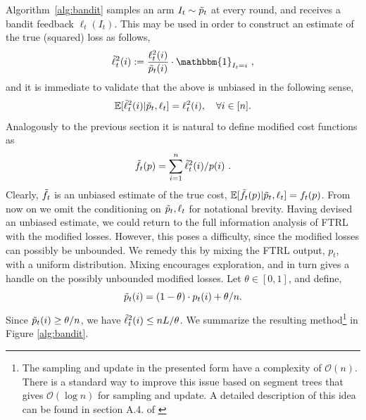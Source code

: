 Algorithm~\ref{alg:bandit} samples an arm $I_t\sim \tilde{p}_t$ at every round, and receives a bandit feedback $\ell_t(I_t)$. 
This may be used in order to construct an estimate of the true (squared) loss as follows,
%
%
\begin{equation*}
\tell_t^2(i) := \frac{\ell_t^2(i)}{\tp_t(i)}\cdot \mathbbm{1} _{I_t=i}~,
\end{equation*}
and it is immediate to validate that the above is unbiased in the following sense, 
\begin{equation*}
\mathbb{E}[\tilde{\ell}_t^2(i) \vert \tilde{p}_t,\ell_t] = \ell_t^2(i),\quad \forall i\in[n].
\end{equation*}
Analogously to the previous section it is natural to define modified cost functions as 
\begin{equation*}
\tilde{f}_t(p) = \sum_{i=1}^n {\tilde{\ell}_t^2(i)}/{p(i)}~.
\end{equation*}
Clearly, $\tilde{f}_t$ is an unbiased estimate of the true cost, $\mathbb{E}[\tilde{f}_t(p) \vert \tilde{p}_t,\ell_t] = f_t(p)$.
From now on  we omit the conditioning on $\tilde{p}_t,\ell_t$ for notational brevity. 
Having devised an unbiased estimate, we could return to the full information analysis of FTRL with the modified losses. However, this poses a difficulty, since the modified losses  can possibly be unbounded. We remedy this by mixing the FTRL output, $p_t$, with a uniform distribution.
Mixing encourages exploration, and in turn gives a handle on the possibly unbounded modified losses. Let $\theta\in [0,1]$, and define,
\begin{equation*}
\tilde{p}_t(i) = (1-\theta)\cdot p_t(i) +{\theta}/{n}.
\end{equation*}
Since $\tilde{p}_t(i) \geq \theta / n$, we have $\tilde{\ell}_t^2(i) \leq nL/\theta$. We summarize the resulting method\footnote{The
sampling and update in the presented form have a complexity of $\mathcal{O}(n)$. 
There is a standard way to improve this issue based on segment trees that gives $\mathcal{O}(\log n)$ for sampling and update. A detailed description of this idea can be found in section A.4. of \cite{salehi2017stochastic}} in Figure \ref{alg:bandit}.
